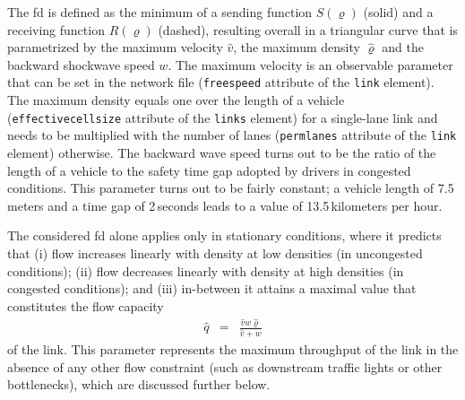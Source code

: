 The \gls{fd} is defined as the minimum of a sending function $S(\varrho)$
(solid) and a receiving function $R(\varrho)$ (dashed), resulting
overall in a triangular curve that is parametrized by the maximum
velocity $\hat{v}$, the maximum density $\hat{\varrho}$ and the
backward shockwave speed $w$. The maximum velocity is an observable
parameter that can be set in the network file (\texttt{freespeed}
attribute of the \texttt{link} element). The maximum density equals
one over the length of a vehicle (\texttt{effectivecellsize} attribute
of the \texttt{links} element) for a single-lane link and needs to
be multiplied with the number of lanes (\texttt{permlanes} attribute
of the \texttt{link} element) otherwise. The backward wave speed turns
out to be the ratio of the length of a vehicle to the safety time
gap adopted by drivers in congested conditions. This parameter turns
out to be fairly constant; a vehicle length of 7.5\,meters and a time
gap of 2\,seconds leads to a value of 13.5\,kilometers per hour. 

The considered \gls{fd} alone applies only in stationary conditions, where
it predicts that (i) flow increases linearly with density at low densities
(\ie in uncongested conditions); (ii) flow decreases linearly with
density at high densities (\ie in congested conditions); and (iii)
in-between it attains a maximal value that constitutes the flow capacity
\begin{eqnarray}
\hat{q} & = & \frac{\hat{v}w\hat{\varrho}}{\hat{v}+w}\label{eq:flow-cap}
\end{eqnarray}
 of the link. This parameter represents the maximum throughput of
the link in the absence of any other flow constraint (such as downstream
traffic lights or other bottlenecks), which are discussed further
below.

